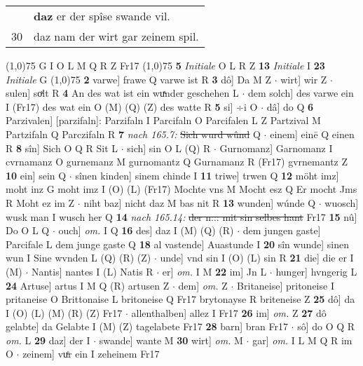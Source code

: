 \documentclass[8pt,a4paper,notitlepage]{article}
\begin{document}
\begin{table}[ht]
\begin{minipage}[t]{0.5\linewidth}
\begin{tabular}{rl}
 & \textbf{daz} er der spîse swande vil.\\ 
30 & daz nam der wirt gar zeinem spil.\\ 
\end{tabular}
\scriptsize
\line(1,0){75} \newline
G I O L M Q R Z Fr17 \newline
\line(1,0){75} \newline
\textbf{5} \textit{Initiale} O L R Z  \textbf{13} \textit{Initiale} I  \textbf{23} \textit{Initiale} G  \newline
\line(1,0){75} \newline
\textbf{2} varwe] frawe Q varwe ist R \textbf{3} dô] Da M Z  $\cdot$ wirt] wir Z  $\cdot$ sulen] soͯlt R \textbf{4} An des wat ist ein wuͯnder geschehen L  $\cdot$ dem solch] des varwe ein I (Fr17) des wat ein O (M) (Q) (Z) des watte R \textbf{5} si] ÷i O  $\cdot$ dâ] do Q \textbf{6} Parzivalen] [parzifaln]: Parzifaln I Parcifaln O Parcifalen L Z Partzival M Partzifaln Q Parczifaln R \textbf{7} \textit{nach 165.7:} \sout{Sich wurd wûnd} Q   $\cdot$ einem] einē Q einen R \textbf{8} sîn] Sich O Q R Sit L  $\cdot$ sich] sin O L (Q) R  $\cdot$ Gurnomanz] Garnomanz I cvrnamanz O gurnemanz M gurnomantz Q Gurnamanz R (Fr17) gvrnemantz Z \textbf{10} ein] sein Q  $\cdot$ sînen kinden] sinem chinde I \textbf{11} triwe] trwen Q \textbf{12} möht imz] moht inz G moht imz I (O) (L) (Fr17) Mochte vns M Mocht esz Q Er mocht Jms R Moht ez im Z  $\cdot$ niht baz] nicht daz M bas nit R \textbf{13} wunden] wúnde Q  $\cdot$ wuosch] wusk man I wusch her Q \textbf{14} \textit{nach 165.14:} \sout{der n::: mit sin selbes hant } Fr17  \textbf{15} nû] Do O L Q  $\cdot$ ouch] \textit{om.} I Q \textbf{16} des] daz I (M) (Q) (R)  $\cdot$ dem jungen gaste] Parcifale L dem junge gaste Q \textbf{18} al vastende] Auastunde I \textbf{20} sîn wunde] sinen wun I Sine wvnden L (Q) (R) (Z)  $\cdot$ unde] vnd sin I (O) (L) sin R \textbf{21} die] die er I (M)  $\cdot$ Nantis] nantes I (L) Natis R  $\cdot$ er] \textit{om.} I M \textbf{22} im] Jn L  $\cdot$ hunger] hvngerig L \textbf{24} Artuse] artus I M Q (R) artusen Z  $\cdot$ dem] \textit{om.} Z  $\cdot$ Britaneise] pritoneise I pritaneise O Brittonaise L britoneise Q Fr17 brytonayse R briteneise Z \textbf{25} dô] da I (O) (L) (M) (R) (Z) Fr17  $\cdot$ allenthalben] allez I Fr17 \textbf{26} im] \textit{om.} Z \textbf{27} dô gelabte] da Gelabte I (M) (Z) tagelabete Fr17 \textbf{28} barn] bran Fr17  $\cdot$ sô] do O Q R \textit{om.} L \textbf{29} daz] der I  $\cdot$ swande] wante M \textbf{30} wirt] \textit{om.} M  $\cdot$ gar] \textit{om.} I L M Q R im O  $\cdot$ zeinem] vuͤr ein I zeheinem Fr17 \newline

\end{minipage}
\end{table}
\end{document}

